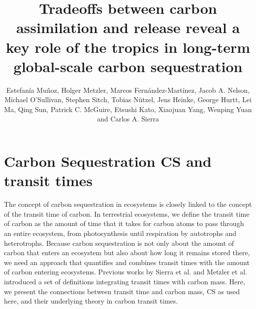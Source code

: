 \documentclass[9pt,twoside,lineno]{pnas-new_SI}
\title{Tradeoffs between carbon assimilation and release reveal a key role of the tropics in long-term global-scale carbon sequestration}
\author{Estefanía Muñoz, Holger Metzler, Marcos Fernández-Martínez, Jacob A. Nelson, Michael O'Sullivan, Stephen Sitch, Tobias Nützel, Jens Heinke, George Hurtt, Lei Ma, Qing Sun, Patrick C. McGuire, Etsushi Kato, Xiaojuan Yang, Wenping Yuan and Carlos A. Sierra}
\newcommand{\CS}{\mathrm{CS}}
\begin{document}
\renewcommand{\thesection}{S\arabic{section}}


\maketitle




\SItext



\section{Carbon Sequestration CS and transit times}
The concept of carbon sequestration in ecosystems is closely linked to the concept of the transit time of carbon. In terrestrial ecosystems, we define the transit time of carbon as the amount of time that it takes for carbon atoms to pass through an entire ecosystem, from photosynthesis until respiration by autotrophs and heterotrophs. 
Because carbon sequestration is not only about the amount of carbon that enters an ecosystem but also about how long it remains stored there, we need an approach that quantifies and combines transit times with the amount of carbon entering ecosystems. Previous works by Sierra et al. \cite{Sierra2021} and Metzler et al. \cite{Metzler2024} introduced a set of definitions integrating transit times with carbon mass. 
Here, we present the connections between transit time and carbon mass, $\CS$ as used here, and their underlying theory in carbon transit times.
\end{document}
